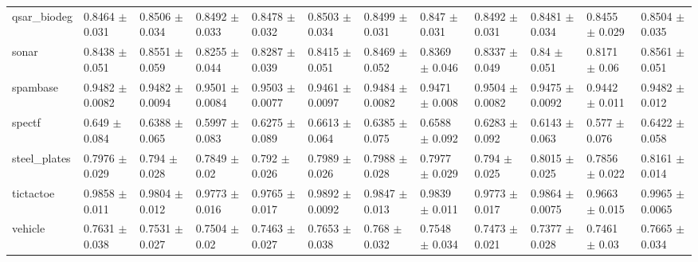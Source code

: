 \begin{tabular}{llllllllllll}
qsar\_biodeg & 0.8464 $\pm$ 0.031 & 0.8506 $\pm$ 0.034 & 0.8492 $\pm$ 0.033 & 0.8478 $\pm$ 0.032 & 0.8503 $\pm$ 0.034 & 0.8499 $\pm$ 0.031 & 0.847 $\pm$ 0.031 & 0.8492 $\pm$ 0.031 & 0.8481 $\pm$ 0.034 & 0.8455 $\pm$ 0.029 & 0.8504 $\pm$ 0.035 \\
sonar & 0.8438 $\pm$ 0.051 & 0.8551 $\pm$ 0.059 & 0.8255 $\pm$ 0.044 & 0.8287 $\pm$ 0.039 & 0.8415 $\pm$ 0.051 & 0.8469 $\pm$ 0.052 & 0.8369 $\pm$ 0.046 & 0.8337 $\pm$ 0.049 & 0.84 $\pm$ 0.051 & 0.8171 $\pm$ 0.06 & 0.8561 $\pm$ 0.051 \\
spambase & 0.9482 $\pm$ 0.0082 & 0.9482 $\pm$ 0.0094 & 0.9501 $\pm$ 0.0084 & 0.9503 $\pm$ 0.0077 & 0.9461 $\pm$ 0.0097 & 0.9484 $\pm$ 0.0082 & 0.9471 $\pm$ 0.008 & 0.9504 $\pm$ 0.0082 & 0.9475 $\pm$ 0.0092 & 0.9442 $\pm$ 0.011 & 0.9482 $\pm$ 0.012 \\
spectf & 0.649 $\pm$ 0.084 & 0.6388 $\pm$ 0.065 & 0.5997 $\pm$ 0.083 & 0.6275 $\pm$ 0.089 & 0.6613 $\pm$ 0.064 & 0.6385 $\pm$ 0.075 & 0.6588 $\pm$ 0.092 & 0.6283 $\pm$ 0.092 & 0.6143 $\pm$ 0.063 & 0.577 $\pm$ 0.076 & 0.6422 $\pm$ 0.058 \\
steel\_plates & 0.7976 $\pm$ 0.029 & 0.794 $\pm$ 0.028 & 0.7849 $\pm$ 0.02 & 0.792 $\pm$ 0.026 & 0.7989 $\pm$ 0.026 & 0.7988 $\pm$ 0.028 & 0.7977 $\pm$ 0.029 & 0.794 $\pm$ 0.025 & 0.8015 $\pm$ 0.025 & 0.7856 $\pm$ 0.022 & 0.8161 $\pm$ 0.014 \\
tictactoe & 0.9858 $\pm$ 0.011 & 0.9804 $\pm$ 0.012 & 0.9773 $\pm$ 0.016 & 0.9765 $\pm$ 0.017 & 0.9892 $\pm$ 0.0092 & 0.9847 $\pm$ 0.013 & 0.9839 $\pm$ 0.011 & 0.9773 $\pm$ 0.017 & 0.9864 $\pm$ 0.0075 & 0.9663 $\pm$ 0.015 & 0.9965 $\pm$ 0.0065 \\
vehicle & 0.7631 $\pm$ 0.038 & 0.7531 $\pm$ 0.027 & 0.7504 $\pm$ 0.02 & 0.7463 $\pm$ 0.027 & 0.7653 $\pm$ 0.038 & 0.768 $\pm$ 0.032 & 0.7548 $\pm$ 0.034 & 0.7473 $\pm$ 0.021 & 0.7377 $\pm$ 0.028 & 0.7461 $\pm$ 0.03 & 0.7665 $\pm$ 0.034 \\
\bottomrule
\end{tabular}
